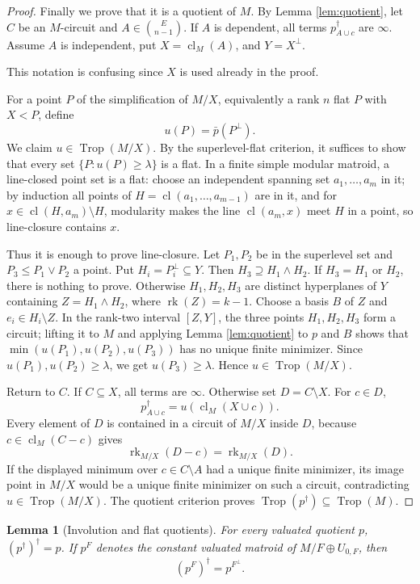 \documentclass[12pt]{article}
\newtheorem{lemma}[theorem]{Lemma}
\theoremstyle{definition}
\newcommand{\Trop}{\operatorname{Trop}}
\newcommand{\rk}{\operatorname{rk}}
\newcommand{\cl}{\operatorname{cl}}
\newcommand{\binomE}[1]{\binom{E}{#1}}
\newcommand{\review}[1]{\begin{reviewbox}#1\end{reviewbox}}
\begin{document}
\begin{proof}
Finally we prove that it is a quotient of \(M\).  By Lemma \ref{lem:quotient}, let \(C\) be an \(M\)-circuit and \(A\in\binomE{n-1}\).  If \(A\) is dependent, all terms \(p^\dagger_{A\cup c}\) are \(\infty\).  Assume \(A\) is independent, put \(X=\cl_M(A)\), and \(Y=X^\perp\).
\review{This notation is confusing since $X$ is used already in the proof.} For a point \(P\) of the simplification of \(M/X\), equivalently a rank \(n\) flat \(P\) with \(X<P\), define
\[
u(P)=\bar p(P^\perp).
\]
We claim \(u\in\Trop(M/X)\).  By the superlevel-flat criterion, it suffices to show that every set \(\{P:u(P)\ge\lambda\}\) is a flat.  In a finite simple modular matroid, a line-closed point set is a flat: choose an independent spanning set \(a_1,\ldots,a_m\) in it; by induction all points of \(H=\cl(a_1,\ldots,a_{m-1})\) are in it, and for \(x\in\cl(H,a_m)\setminus H\), modularity makes the line \(\cl(a_m,x)\) meet \(H\) in a point, so line-closure contains \(x\).

Thus it is enough to prove line-closure.  Let \(P_1,P_2\) be in the superlevel set and \(P_3\le P_1\vee P_2\) a point.  Put \(H_i=P_i^\perp\subseteq Y\).  Then \(H_3\supseteq H_1\wedge H_2\).  If \(H_3=H_1\) or \(H_2\), there is nothing to prove.  Otherwise \(H_1,H_2,H_3\) are distinct hyperplanes of \(Y\) containing \(Z=H_1\wedge H_2\), where \(\rk(Z)=k-1\).  Choose a basis \(B\) of \(Z\) and \(e_i\in H_i\setminus Z\).  In the rank-two interval \([Z,Y]\), the three points \(H_1,H_2,H_3\) form a circuit; lifting it to \(M\) and applying Lemma \ref{lem:quotient} to \(p\) and \(B\) shows that \(\min(u(P_1),u(P_2),u(P_3))\) has no unique finite minimizer.  Since \(u(P_1),u(P_2)\ge\lambda\), we get \(u(P_3)\ge\lambda\).  Hence \(u\in\Trop(M/X)\).

Return to \(C\).  If \(C\subseteq X\), all terms are \(\infty\).  Otherwise set \(D=C\setminus X\).  For \(c\in D\),
\[
p^\dagger_{A\cup c}=u(\cl_M(X\cup c)).
\]
Every element of \(D\) is contained in a circuit of \(M/X\) inside \(D\), because \(c\in\cl_M(C-c)\) gives
\[
\rk_{M/X}(D-c)=\rk_{M/X}(D).
\]
If the displayed minimum over \(c\in C\setminus A\) had a unique finite minimizer, its image point in \(M/X\) would be a unique finite minimizer on such a circuit, contradicting \(u\in\Trop(M/X)\).  The quotient criterion proves \(\Trop(p^\dagger)\subseteq\Trop(M)\).
\end{proof}

\begin{lemma}[Involution and flat quotients]\label{lem:invflat}
For every valuated quotient \(p\), \((p^\dagger)^\dagger=p\).  If \(p^F\) denotes the constant valuated matroid of \(M/F\oplus U_{0,F}\), then
\[
(p^F)^\dagger=p^{F^\perp}.
\]
\end{lemma}
\end{document}
